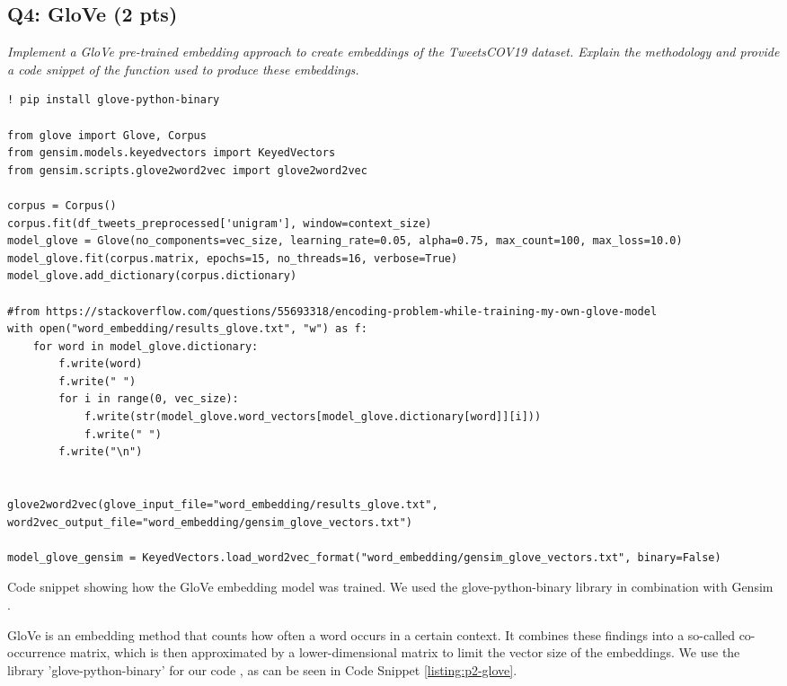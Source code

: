 \subsection*{Q4: GloVe (2 pts)}
\textit{Implement a GloVe pre-trained embedding approach to create embeddings of the TweetsCOV19 dataset. Explain the methodology and provide a code snippet of the function used to produce these embeddings.}
\begin{listing*}
\begin{verbatim}
! pip install glove-python-binary

from glove import Glove, Corpus
from gensim.models.keyedvectors import KeyedVectors
from gensim.scripts.glove2word2vec import glove2word2vec

corpus = Corpus() 
corpus.fit(df_tweets_preprocessed['unigram'], window=context_size)
model_glove = Glove(no_components=vec_size, learning_rate=0.05, alpha=0.75, max_count=100, max_loss=10.0)
model_glove.fit(corpus.matrix, epochs=15, no_threads=16, verbose=True)
model_glove.add_dictionary(corpus.dictionary)

#from https://stackoverflow.com/questions/55693318/encoding-problem-while-training-my-own-glove-model
with open("word_embedding/results_glove.txt", "w") as f:
    for word in model_glove.dictionary:
        f.write(word)
        f.write(" ")
        for i in range(0, vec_size):
            f.write(str(model_glove.word_vectors[model_glove.dictionary[word]][i]))
            f.write(" ")
        f.write("\n")


glove2word2vec(glove_input_file="word_embedding/results_glove.txt", word2vec_output_file="word_embedding/gensim_glove_vectors.txt")    

model_glove_gensim = KeyedVectors.load_word2vec_format("word_embedding/gensim_glove_vectors.txt", binary=False)
\end{verbatim}
\caption{Code snippet showing how the GloVe embedding model was trained. We used the glove-python-binary library \cite{glovegit} in combination with Gensim \cite{gensim}.}
\label{listing:p2-glove}
\end{listing*}

GloVe \cite{glove} is an embedding method that counts how often a word occurs in a certain context. It combines these findings into a so-called co-occurrence matrix, which is then approximated by a lower-dimensional matrix to limit the vector size of the embeddings.
We use the library 'glove-python-binary' for our code \cite{glovegit}, as can be seen in Code Snippet \ref{listing:p2-glove}.

